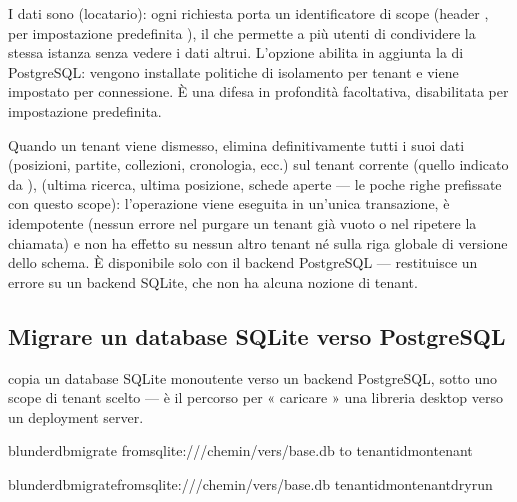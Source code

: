 \documentclass[letterpaper,10pt,italian]{sphinxmanual}
\begin{document}
\sphinxAtStartPar
I dati sono  (locatario): ogni richiesta porta un identificatore di scope (header , per impostazione predefinita ), il che permette a più utenti di condividere la stessa istanza senza vedere i dati altrui. L’opzione  abilita in aggiunta la  di PostgreSQL: vengono installate politiche di isolamento per tenant e  viene impostato per connessione. È una difesa in profondità facoltativa, disabilitata per impostazione predefinita.

\sphinxAtStartPar
Quando un tenant viene dismesso,  elimina definitivamente tutti i suoi dati (posizioni, partite, collezioni, cronologia, ecc.) sul tenant corrente (quello indicato da ),  (ultima ricerca, ultima posizione, schede aperte — le poche righe  prefissate con questo scope): l’operazione viene eseguita in un’unica transazione, è idempotente (nessun errore nel purgare un tenant già vuoto o nel ripetere la chiamata) e non ha effetto su nessun altro tenant né sulla riga globale di versione dello schema. È disponibile solo con il backend PostgreSQL — restituisce un errore  su un backend SQLite, che non ha alcuna nozione di tenant.


\subsection{Migrare un database SQLite verso PostgreSQL}
\label{\detokenize{mode_headless:migrer-une-base-sqlite-vers-postgresql}}\label{\detokenize{mode_headless:headless-migrate}}
\sphinxAtStartPar
{} copia un database SQLite monoutente verso un backend PostgreSQL, sotto uno scope di tenant scelto — è il percorso per « caricare » una libreria desktop verso un deployment server.

\begin{sphinxVerbatim}[commandchars=\\\{\}]
blunderdbmigrate
\PYGZhy{}\PYGZhy{}fromsqlite:///chemin/vers/base.db
\PYGZhy{}\PYGZhy{}to
\PYGZhy{}\PYGZhy{}tenant\PYGZhy{}idmon\PYGZhy{}tenant

blunderdbmigrate\PYGZhy{}\PYGZhy{}fromsqlite:///chemin/vers/base.db
\PYGZhy{}\PYGZhy{}tenant\PYGZhy{}idmon\PYGZhy{}tenant\PYGZhy{}\PYGZhy{}dry\PYGZhy{}run
\end{sphinxVerbatim}
\end{document}
